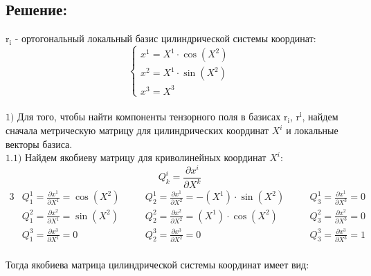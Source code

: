 \documentclass{article}
\begin{document}
\subsection*{Решение:}
$\mathrm{r_i}$ - ортогональный локальный базис цилиндрической системы координат:\\
\[
\begin{cases}
  x^1 = X^1 \cdot \cos(X^2)\\
  x^2 = X^1 \cdot \sin(X^2)\\
  x^3 = X^3
\end{cases}
\]\\
$\mathrm{1)}$ Для того, чтобы найти компоненты тензорного поля в базисах $\mathrm{r_i}$, $\mathrm{r^i}$,
найдем сначала метрическую матрицу для цилиндрических координат $X^i$ и локальные векторы базиса.\\
$\mathrm{1.1)}$ Найдем якобиеву матрицу для криволинейных координат $X^i$:\\
\[
Q^i_k = \frac{\partial x^i}{\partial X^k}
\]
\begin{alignat*}{3}
  & Q^1_1 = \frac{\partial x^1}{\partial X^1} = \cos(X^2) \quad &&Q^1_2 = \frac{\partial x^1}{\partial X^2} = -(X^1)\cdot \sin(X^2) \quad &&Q^1_3 = \frac{\partial x^1}{\partial X^3} = 0 \\
  & Q^2_1 = \frac{\partial x^2}{\partial X^1} = \sin(X^2) \quad &&Q^2_2 = \frac{\partial x^2}{\partial X^2} = (X^1)\cdot \cos(X^2) \quad &&Q^2_3 = \frac{\partial x^2}{\partial X^3} = 0 \\
  & Q^3_1 = \frac{\partial x^3}{\partial X^1} = 0 \quad &&Q^3_2 = \frac{\partial x^3}{\partial X^2} = 0 \quad &&Q^3_3 = \frac{\partial x^3}{\partial X^3} = 1 
\end{alignat*}\\
Тогда якобиева матрица цилиндрической системы координат имеет вид:\\
\end{document}
